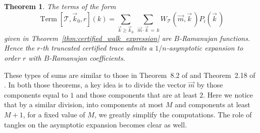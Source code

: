 \documentclass{memo-l}
\theoremstyle{plain}
\theoremstyle{definition}
\numberwithin{section}{chapter}
\numberwithin{equation}{chapter}
\DeclareMathOperator{\Term}{Term}
\theoremstyle{plain}
\newtheorem{thm}[theorem]{Theorem}
\theoremstyle{definition}
\newcommand\cT{\mathcal{T}}
\begin{document}
\begin{thm}\label{thm:certified_B_Ramanujan} The terms of the form
\begin{equation}\label{equ:ML_sum_Qi} \Term [ \cT, \vec k_0, r ] (k) =
\sum_{\vec k \geq \vec k_0} 
\ \sum_{\vec m \cdot \vec k \,=\, k} W_\cT(\vec
m, \vec k\,) P_i(\vec k\,) \end{equation} given in
Theorem~\ref{thm:certified_walk_expression} are \(B\)-Ramanujan functions.
Hence the $r$-th truncated certified trace admits a
$1/n$-asymptotic expansion to order $r$ with \(B\)-Ramanujan coefficients.
\end{thm}

These types of sums are similar to those in Theorem~8.2 of
\cite{friedman_alon} and Theorem~2.18 of \cite{friedman_random_graphs}. In
both those theorems, a key idea is to divide the vector \( \vec m \) by
those components equal to \( 1 \) and those components that are at least \(
2 \). Here we notice that by a similar division, into components at most \(
M \) and components at least \( M+1 \), for a fixed value of \( M \), we
greatly simplify the computations. The role of tangles on the asymptotic
expansion becomes clear as well.
\end{document}

